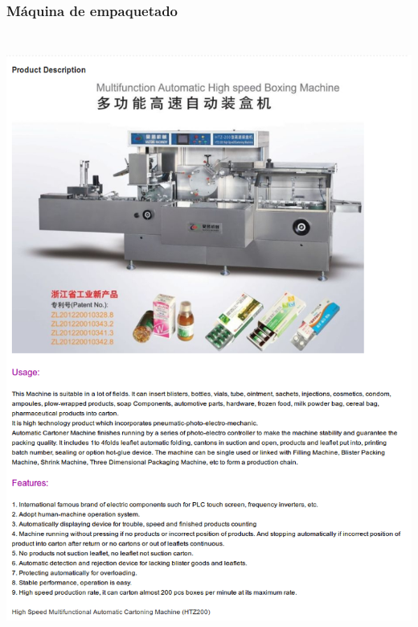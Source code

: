 \subsubsection{Máquina de empaquetado}
\includegraphics[width=15cm,height=20cm,keepaspectratio]{Datasheets/7MaquinaEmpaquetado.png} 
\newpage
